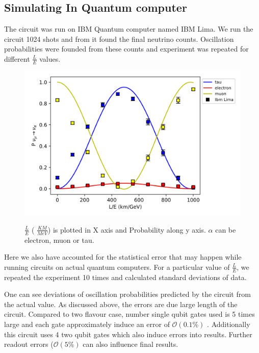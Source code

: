 \documentclass[12pt,a4paper]{report}
\begin{document}
\subsection{Simulating In Quantum computer}
The circuit was run on IBM Quantum computer named IBM Lima. We run the circuit 1024 shots and from it found the final neutrino counts. Oscillation probabilities were founded from these counts and experiment was repeated for different $\frac{L}{E}$ values.
\begin{figure}[h]
	\graphicspath{ {./Images/} }
	\centering	
	{\includegraphics[width=\textwidth]{fig_9.png}}
	\caption{$\frac{L}{E}$ ( $\frac{KM}{MeV}$) is plotted in X axis and Probability along y axis. $\alpha$ can be electron, muon or tau.}
		\label{fig 9}
	\end{figure}
	Here we also have accounted for the statistical error that may happen while running circuits on actual quantum computers. For a particular value of $\frac{L}{E}$, we repeated the experiment 10 times and calculated standard deviations of data. \par 
	One can see deviations of oscillation probabilities predicted by the circuit from the actual value. As discussed above, the errors are due large length of the circuit. Compared to two flavour case, number single qubit gates used is 5 times large and each gate approximately induce an error of $\mathcal{O}(0.1\%)$ . Additionally this circuit uses 4 two qubit gates which also induce errors into results. Further readout errors  ($\mathcal{O}(5\%)$ can also influence final results.
	

\printindex
\end{document}
